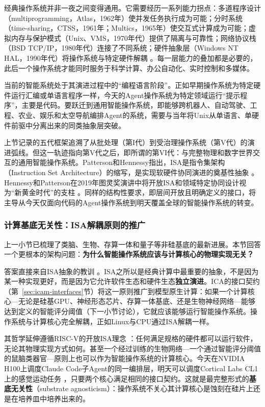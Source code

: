经典操作系统并非一夜之间变得通用。它需要经历一系列能力拐点：多道程序设计（multiprogramming，Atlas，1962年）使并发任务执行成为可能；分时系统（time-sharing，CTSS，1961年；Multics，1965年）使交互式计算成为可能；虚拟内存与保护模式（Unix、VMS，1970年代）提供了隔离与可靠性；网络协议栈（BSD TCP/IP，1980年代）连接了不同系统；硬件抽象层（Windows NT HAL，1990年代）将操作系统与特定硬件解耦 \cite{ritchie_thompson_1974, corbato_1962_ctss, corbato_1965_multics}。每一层能力的叠加都是必要的，此后一个操作系统才能同时服务于科学计算、办公自动化、实时控制和多媒体。

当前的智能系统处于其演进过程中的``编程语言阶段''。正如早期操作系统为特定硬件运行汇编或单语言程序一样，今天的Agent操作系统为特定领域运行``提示程序''，主要是代码。要跃迁到通用智能操作系统，即能够跨机器人、自动驾驶、工程、农业、娱乐和太空导航编排Agent的系统，需要与当年将Unix从单语言、单硬件前驱中分离出来的同类抽象层突破。

上节记录的五代框架追溯了从批处理（第I代）到受治理操作系统（第V代）的演进弧线。但这一轨迹指向第V代之后，即所谓的第VI代：与完整物理和数字世界交互的通用智能操作系统。Patterson和Hennessy指出，ISA是指令集架构（Instruction Set Architecture）的缩写，是实现软硬件协同演进的奠基性抽象 \cite{patterson_hennessy_2017}。Hennessy和Patterson在2019年图灵奖演讲中将开放ISA和领域特定协同设计视为``新黄金时代''的支柱 \cite{hennessy_patterson_2019}。同样的结构性要求，即层间开放且明确定义的接口，将主导从今天仅面向代码的Agent操作系统到明天覆盖全球的智能操作系统的转变。

\subsubsection{计算基底无关性：ISA解耦原则的推广}

上一小节已梳理了类脑、生物、存算一体和量子等非硅基底的最新进展。本节回答一个更根本的架构问题：\textbf{为什么智能操作系统应该与计算核心的物理实现无关？}

答案直接来自ISA抽象的教训 \cite{patterson_hennessy_2017}。ISA之所以是经典计算中最重要的抽象，不是因为某一种实现更好，而是因为它允许软件生态和硬件生态\textbf{独立演进}。ICA的接口契约（第~\ref{sec:icam-interfaces}节）将这一原则推广到模型原生计算：如果一个计算核心---无论是硅基GPU、神经形态芯片、存算一体基底、还是生物神经网络---能够达到定义的智能评分阈值（下一小节讨论），它就应该能够运行智能操作系统。操作系统与计算核心完全解耦，正如Linux与CPU通过ISA解耦一样。

其哲学延伸遵循RISC-V的开放ISA理念 \cite{hennessy_patterson_2019}：任何满足规格的硬件都可以运行软件，无论其物理实现方式如何。甚至一个经过训练的生物网络---一个通过智能评分阈值的鼠脑类器官---原则上也可以作为智能操作系统的计算核心。今天在NVIDIA H100上调度Claude Code子Agent的同一编排层，明天可以调度Cortical Labs CL1上的感觉运动任务 \cite{cortical_2025_cl1}，只要两个核心满足相同的接口契约。这就是最完整形式的\textbf{基底无关性}（substrate agnosticism）：操作系统不关心其计算核心是蚀刻在硅片上还是在培养皿中培养出来的。

